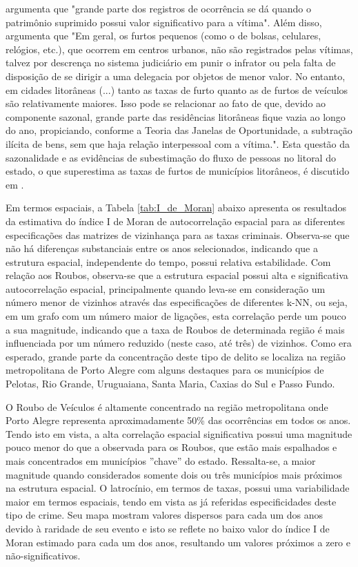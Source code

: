 \documentclass[12pt,openright,oneside,a4paper,english,french,spanish]{abntex2}
\numberwithin{table}{section} %
\numberwithin{figure}{section} %
\newcommand{\co}{\citeonline}
\begin{document}
\co{cortes2016tdfee} argumenta que "grande parte dos registros de ocorrência se dá quando o patrimônio suprimido possui valor significativo para a vítima". Além disso, argumenta que "Em geral, os furtos pequenos (como o de bolsas, celulares, relógios, etc.), que ocorrem em centros urbanos, não são registrados pelas vítimas, talvez por descrença no sistema judiciário em punir o infrator ou pela falta de disposição de se dirigir a uma delegacia por objetos de menor valor. No entanto, em cidades litorâneas (...) tanto as taxas de furto quanto as de furtos de veículos são relativamente maiores. Isso pode se relacionar ao fato de que, devido ao componente sazonal, grande parte das residências litorâneas fique vazia ao longo do ano, propiciando, conforme a Teoria das Janelas de Oportunidade, a subtração ilícita de bens, sem que haja relação interpessoal com a vítima.". Esta questão da sazonalidade e as evidências de subestimação do fluxo de pessoas no litoral do estado, o que superestima as taxas de furtos de municípios litorâneos, é discutido em \co{zuanazzi2016}.

Em termos espaciais, a Tabela \ref{tab:I_de_Moran} abaixo apresenta os resultados da estimativa do índice I de Moran de autocorrelação espacial para as diferentes especificações das matrizes de vizinhança para as taxas criminais. Observa-se que não há diferenças substanciais entre os anos selecionados, indicando que a estrutura espacial, independente do tempo, possui relativa estabilidade. Com relação aos Roubos, observa-se que a estrutura espacial possui alta e significativa autocorrelação espacial, principalmente quando leva-se em consideração um número menor de vizinhos através das especificações de diferentes k-NN, ou seja, em um grafo com um número maior de ligações, esta correlação perde um pouco a sua magnitude, indicando que a taxa de Roubos de determinada região é mais influenciada por um número reduzido (neste caso, até três) de vizinhos. Como era esperado, grande parte da concentração deste tipo de delito se localiza na região metropolitana de Porto Alegre com alguns destaques para os municípios de Pelotas, Rio Grande, Uruguaiana, Santa Maria, Caxias do Sul e Passo Fundo. 

O Roubo de Veículos é altamente concentrado na região metropolitana onde Porto Alegre representa aproximadamente 50\% das ocorrências em todos os anos. Tendo isto em vista, a alta correlação espacial significativa possui uma magnitude pouco menor do que a observada para os Roubos, que estão mais espalhados e mais concentrados em municípios ''chave'' do estado. Ressalta-se, a maior magnitude quando considerados somente dois ou três municípios mais próximos na estrutura espacial. O latrocínio, em termos de taxas, possui uma variabilidade maior em termos espaciais, tendo em vista as já referidas especificidades deste tipo de crime. Seu mapa mostram valores dispersos para cada um dos anos devido à raridade de seu evento e isto se reflete no baixo valor do índice I de Moran estimado para cada um dos anos, resultando um valores próximos a zero e não-significativos. 
\end{document}
